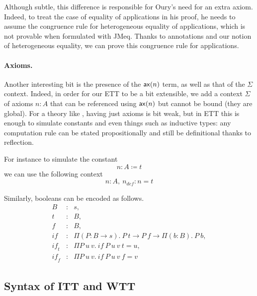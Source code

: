 Although subtle, this difference is responsible for Oury's need for an
extra axiom. Indeed, to treat the case of equality of applications in
his proof, he needs to assume the congruence rule for heterogeneous
equality of applications, which is not provable when formulated with
\acrshort{JMeq}. Thanks to annotations and our notion of heterogeneous equality,
we can prove this congruence rule for applications.

\paragraph{Axioms.}

Another interesting bit is the presence of the \(\mathsf{ax}(n)\) term, as well as
that of the \(\Sigma\) context. Indeed, in order for our \acrshort{ETT} to be
a bit extensible, we add a context \(\Sigma\) of axioms \(n : A\) that can be
referenced using \(\mathsf{ax}(n)\) but cannot be bound (they are global).
For a theory like \Coq, having just axioms is bit weak, but in \acrshort{ETT}
this is enough to simulate constants and even things such as inductive types:
any computation rule can be stated propositionally and still be definitional
thanks to reflection.

For instance to simulate the constant
\[
  n : A \coloneqq t
\]
we can use the following context
\[
  n : A,\ n_{\mathit{def}} : n = t
\]

Similarly, booleans can be encoded as follows.
\[
  \begin{array}{lcl}
    B &:& s, \\
    t &:& B, \\
    f &:& B, \\
    \mathit{if} &:& \Pi (P : B \to s).\ P\ t \to P\ f \to \Pi (b : B).\ P\ b, \\
    \mathit{if_t} &:& \Pi P\ u\ v.\ \mathit{if}\ P\ u\ v\ t = u, \\
    \mathit{if_f} &:& \Pi P\ u\ v.\ \mathit{if}\ P\ u\ v\ f = v
  \end{array}
\]

\subsection{Syntax of \acrshort{ITT} and \acrshort{WTT}}


